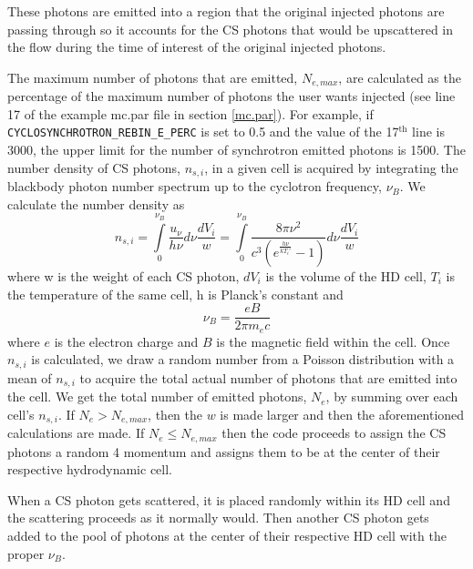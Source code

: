 \documentclass[12pt,a4paper]{article}
\begin{document}
These photons are emitted into a region that the original injected photons are passing through so it accounts for the CS photons that would be upscattered in the flow during the time of interest of the original injected photons.

The maximum number of photons that are emitted, $N_{e,max}$, are calculated as the percentage of the maximum number of photons the user wants injected (see line 17 of the example mc.par file in section \ref{mc.par}). For example, if \texttt{CYCLOSYNCHROTRON\_REBIN\_E\_PERC} is set to 0.5 and the value of the 17$^\textrm{th}$ line is 3000, the upper limit for the number of synchrotron emitted photons is 1500. The number density of CS photons, $n_{s,i}$, in a given cell is acquired by integrating the blackbody photon number spectrum up to the cyclotron frequency, $\nu_B$. We calculate the number density as
\begin{equation}
n_{s,i}=\int\limits_{0}^{\nu_B}\frac{u_\nu}{h \nu}d\nu\frac{dV_i}{w}=\int\limits_{0}^{\nu_B}\frac{8\pi \nu^2 }{c^3 (e^\frac{h\nu}{kT_i'}-1 )}d\nu\frac{dV_i}{w}
\end{equation}
 where w is the weight of each CS photon, $dV_i$ is the volume of the HD cell, $T_i$ is the temperature of the same cell, h is Planck's constant and 
\begin{equation}
\nu_B=\frac{eB}{2\pi m_e c}
\end{equation}
where $e$ is the electron charge and $B$ is the magnetic field within the cell. Once $n_{s,i}$ is calculated, we draw a random number from a Poisson distribution with a mean of $n_{s,i}$ to acquire the total actual number of photons that are emitted into the cell. We get the total number of emitted photons, $N_e$, by summing over each cell's $n_{s,i}$. If $N_e > N_{e,max}$, then the $w$ is made larger and then the aforementioned calculations are made. If $N_e \le N_{e,max}$ then the code proceeds to assign the CS photons a random 4 momentum and assigns them to be at the center of their respective hydrodynamic cell.

When a CS photon gets scattered, it is placed randomly within its HD cell and the scattering proceeds as it normally would. Then another CS photon gets added to the pool of photons at the center of their respective HD cell with the proper $\nu_B$.
\end{document}
